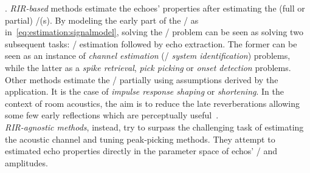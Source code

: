 .
\textit{RIR-based} methods estimate the echoes' properties after estimating the (full or partial) \RIR/(s).
By modeling the early part of the \RIR/ as in~\cref{eq:estimation:signalmodel}, solving the \AER/ problem can be seen as solving two subsequent tasks: \RIR/ estimation followed by echo extraction.
The former can be seen as an instance of \textit{channel estimation} (\aka/ \textit{system identification}) problems, while the latter as a \textit{spike retrieval}, \textit{pick picking} or \textit{onset detection} problems.
Other methods estimate the \RIRs/ partially using assumptions derived by the application.
It is the case of \textit{impulse response shaping} or \textit{shortening}.
In the context of room acoustics, the aim is to reduce the late reverberations allowing some few early reflections which are perceptually useful~.
\\\textit{RIR-agnostic methods}, instead, try to surpass the challenging task of estimating the acoustic channel and tuning peak-picking methods.
They attempt to estimated echo properties directly in the parameter space of echos' \TOAs/ and amplitudes.

\begin{figure}[h]
    \footnotesize
    \resizebox{\linewidth}{!}{
        
    }
    \vspace{-\baselineskip}\vspace{-\baselineskip}
\end{figure}



